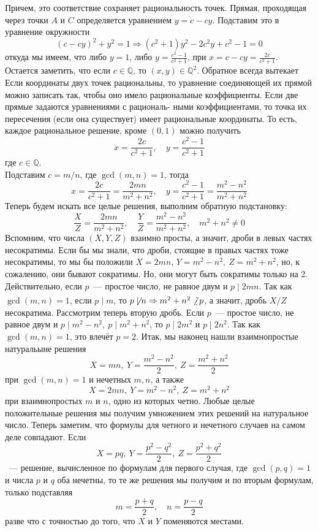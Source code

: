 \documentclass[11pt]{article}
\begin{document}
\begin{example}
        Причем, это соответствие сохраняет рациональность точек. Прямая, проходящая через точки $A$ и $C$ определяется
        уравнением $y = c - cy$. Подставим это в уравнение окружности
        \[ (c - cy)^2 + y^2 = 1 \Rightarrow  (c^2 + 1)y^2 - 2c^2 y + c^2 - 1 = 0 \]
        откуда мы имеем, что либо $y = 1$, либо $y = \frac{c^2 - 1}{c^2 + 1}$, при $x = c - cy = \frac{2c}{c^2 + 1}$.
        Остается заметить, что если $c \in \mathbb{Q}$, то $(x, y) \in \mathbb{Q}^2$. Обратное всегда вытекает Если координаты двух точек рациональны, то уравнение соединяющей их прямой можно записать так, чтобы оно имело рациональные коэффициенты.
        Если две прямые задаются уравнениями с рациональ- ными коэффициентами, то точка их пересечения (если она существует) имеет рациональные координаты.
        То есть, каждое рациональное решение, кроме $(0, 1)$ можно получить
        \[ x = \frac{2c}{c^2 + 1}, \quad y = \frac{c^2 - 1}{c^2 + 1} \]
        где $c \in \mathbb{Q}$. \\
        Подставим $c = m / n$, где $\gcd(m, n) = 1$, тогда
        \[ x = \frac{2c}{c^2 + 1} = \frac{2mn}{m^2 + n^2}, \quad y = \frac{c^2 - 1}{c^2 + 1} = \frac{m^2 - n^2}{m^2 + n^2}\]
        Теперь будем искать все целые решения, выполним обратную подстановку:
        \[ \frac{X}{Z} = \frac{2mn}{m^2 + n^2}, \quad \frac{Y}{Z} = \frac{m^2 - n^2}{m^2 + n^2}, \quad m^2 + n^2 \neq 0 \]
        Вспомним, что числа $(X, Y, Z)$ взаимно просты, а значит, дроби в левых частях несократимы. Если бы мы знали, что дроби, стоящие в правых частях тоже несократимы, то
        мы бы положили $X = 2mn$, $Y = m^2 - n^2, \ Z = m^2 + n^2$, но, к сожалению, они бывают сократимы.
        Но, они могут быть сократимы только на 2. Действительно, если $p$~--- простое число, не равное двум и $p \mid 2 mn$. Так как
        $\gcd(m, n) = 1$, если $p \mid m$, то $p \not\mid n \Rightarrow m^2 + n^2 \not\divisible p$, а значит, дробь $X / Z$ несократима.
        Рассмотрим теперь вторую дробь. Если $p$~--- простое число, не равное двум и $p \mid m^2 - n^2, \ p \mid m^2 + n^2$, то
        $p \mid 2m^2$ и $p \mid 2n^2$. Так как $\gcd(m, n) = 1$,  это влечёт $p = 2$. Итак, мы
        наконец нашли взаимнопростые натуральыне решения
        \[ X = mn, \ Y = \frac{m^2 - n^2}{2}, \ Z = \frac{m^2 + n^2}{2} \]
        при $\gcd(m, n) = 1$ и нечетных $m, n$, а также
        \[ X = 2mn, \ Y = m^2 - n^2, \ Z = m^2 + n^2 \]
        при взаимнопростых $m$ и $n$, одно из которых четно. Любые целые положительные решения мы получим умножением этих решений на натуральное число.
        Теперь заметим, что формулы для четного и нечетного случаев на самом деле совпадают.
        Если
        \[ X = pq,\  Y = \frac{p^2 - q^2}{2}, \ Z = \frac{p^2 + q^2}{2}\]
        ~--- решение, вычисленное по формулам для первого случая, где $\gcd(p, q) = 1$ и числа $p$ и $q$ оба нечетны, то те же решения
        мы получим и по вторым формулам, только подставляя
        \[ m = \frac{p + q}{2}, \quad n = \frac{p - q}{2} \]
        разве что с точностью до того, что $X$ и $Y$ поменяются местами.
    \end{example}
\end{document}

